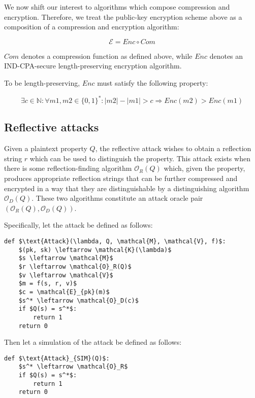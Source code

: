 \documentclass{article}
\begin{document}
We now shift our interest to algorithms which compose compression and
encryption.  Therefore, we treat the public-key encryption scheme above as a
composition of a compression and encryption algorithm:

\begin{equation*}
    \mathcal{E} = Enc \circ Com
\end{equation*}

$Com$ denotes a compression function as defined above, while $Enc$ denotes an
IND-CPA-secure length-preserving encryption algorithm.

To be length-preserving, $Enc$ must satisfy the following property:

\begin{equation*}
    \exists c \in \mathbb{N}:
    \forall m1, m2 \in \{0, 1\}^*:
    |m2| - |m1| > c
    \Rightarrow
    Enc(m2) > Enc(m1)
\end{equation*}

\subsection*{Reflective attacks}

Given a plaintext property $Q$, the reflective attack wishes to obtain a
reflection string $r$ which can be used to distinguish the property. This
attack exists when there is some reflection-finding algorithm
$\mathcal{O}_R(Q)$ which, given the property,
 produces appropriate reflection strings that can be further compressed and
 encrypted in a way that they are distinguishable by a distinguishing algorithm
 $\mathcal{O}_D(Q)$.  These two algorithms constitute an attack oracle pair
 $(\mathcal{O}_R(Q), \mathcal{O}_D(Q))$.

Specifically, let the attack be defined as follows:

\begin{lstlisting}[texcl,mathescape]
def $\text{Attack}(\lambda, Q, \mathcal{M}, \mathcal{V}, f)$:
    $(pk, sk) \leftarrow \mathcal{K}(\lambda)$
    $s \leftarrow \mathcal{M}$
    $r \leftarrow \mathcal{O}_R(Q)$
    $v \leftarrow \mathcal{V}$
    $m = f(s, r, v)$
    $c = \mathcal{E}_{pk}(m)$
    $s^* \leftarrow \mathcal{O}_D(c)$
    if $Q(s) = s^*$:
        return 1
    return 0
\end{lstlisting}

Then let a simulation of the attack be defined as follows:

\begin{lstlisting}[texcl,mathescape]
def $\text{Attack}_{SIM}(Q)$:
    $s^* \leftarrow \mathcal{O}_R$
    if $Q(s) = s^*$:
        return 1
    return 0
\end{lstlisting}
\end{document}
